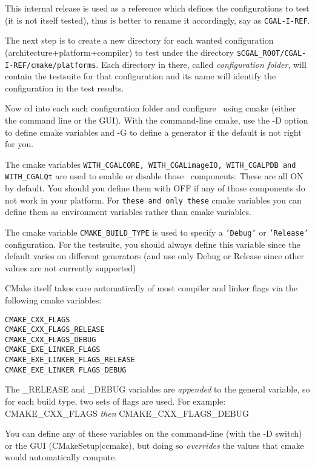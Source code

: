 This internal release is used as a reference
which defines the configurations to test (it is not itself tested), 
thus is better to rename it accordingly, say as {\tt CGAL-I-REF}.

The next step is to create a new directory for each wanted configuration 
(architecture+platform+compiler)
to test under the directory {\tt \$CGAL\_ROOT/CGAL-I-REF/cmake/platforms}.
Each directory in there, called {\em configuration folder}, will contain the testsuite 
for that configuration and its name will identify the configuration 
in the test results.

Now cd into each such configuration folder and configure \cgal\ using cmake
(either the command line or the GUI). With the command-line cmake,
use the -D option to define cmake variables and -G
to define a generator if the default is not right for you.


The cmake variables {\tt WITH\_CGALCORE, WITH\_CGALimageIO, WITH\_CGALPDB and WITH\_CGALQt}
are used to enable or disable those \cgal\ components. These are all ON by default.
You should you define them with OFF if any of those components do not work in your platform. 
For {\tt these and only these} cmake variables you can define them as environment variables
rather than cmake variables.

The cmake variable {\tt CMAKE\_BUILD\_TYPE} is used to specify a {\tt 'Debug'} or {\tt 'Release'}
configuration. For the testsuite, you should always define this variable
since the default varies on different generators (and use only Debug or Release
since other values are not currently supported)

CMake itself takes care automatically of most compiler and linker flags
via the following cmake variables:

\begin{verbatim}
CMAKE_CXX_FLAGS
CMAKE_CXX_FLAGS_RELEASE
CMAKE_CXX_FLAGS_DEBUG
CMAKE_EXE_LINKER_FLAGS
CMAKE_EXE_LINKER_FLAGS_RELEASE
CMAKE_EXE_LINKER_FLAGS_DEBUG
\end{verbatim}

The \_RELEASE and \_DEBUG variables are {\em appended} to the general variable, so for each
build type, two sets of flags are used. For example: CMAKE\_CXX\_FLAGS {\em then} CMAKE\_CXX\_FLAGS\_DEBUG 

You can define any of these variables on the command-line (with the -D switch) or the GUI (CMakeSetup|ccmake),
but doing so {\em overrides} the values that cmake would automatically compute.

